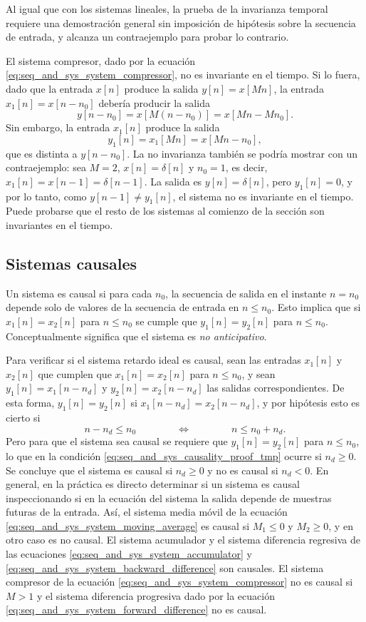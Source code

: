 \documentclass[a4paper]{report}
\begin{document}
Al igual que con los sistemas lineales, la prueba de la invarianza temporal requiere una demostración general sin imposición de hipótesis sobre la secuencia de entrada, y alcanza un contraejemplo para probar lo contrario.

El sistema compresor, dado por la ecuación \ref{eq:seq_and_sys_system_compressor}, no es invariante en el tiempo. Si lo fuera, dado que la entrada \(x[n]\) produce la salida \(y[n]=x[Mn]\), la entrada \(x_1[n]=x[n-n_0]\) debería producir la salida
\[
 y[n-n_0]=x[M(n-n_0)]=x[Mn-Mn_0].
\]
Sin embargo, la entrada \(x_1[n]\) produce la salida
\[
 y_1[n]=x_1[Mn]=x[Mn-n_0],
\]
que es distinta a \(y[n-n_0]\). La no invarianza también se podría mostrar con un contraejemplo: sea \(M=2\), \(x[n]=\delta[n]\) y \(n_0=1\), es decir, \(x_1[n]=x[n-1]=\delta[n-1]\). La salida es \(y[n]=\delta[n]\), pero \(y_1[n]=0\), y por lo tanto, como \(y[n-1]\neq y_1[n]\), el sistema no es invariante en el tiempo. Puede probarse que el resto de los sistemas al comienzo de la sección son invariantes en el tiempo.

\subsection{Sistemas causales}\label{sec:seq_and_sys_causal_system} 

Un sistema es causal si para cada \(n_0\), la secuencia de salida en el instante \(n=n_0\) depende solo de valores de la secuencia de entrada en \(n\leq n_0\). Esto implica que si \(x_1[n]=x_2[n]\) para \(n\leq n_0\) se cumple que \(y_1[n]=y_2[n]\) para \(n\leq n_0\). Conceptualmente significa que el sistema es \emph{no anticipativo}.

Para verificar si el sistema retardo ideal es causal, sean las entradas \(x_1[n]\) y \(x_2[n]\) que cumplen que \(x_1[n]=x_2[n]\) para \(n\leq n_0\), y sean \(y_1[n]=x_1[n-n_d]\) y \(y_2[n]=x_2[n-n_d]\) las salidas correspondientes. De esta forma, \(y_1[n]=y_2[n]\) si \(x_1[n-n_d]=x_2[n-n_d]\), y por hipótesis esto es cierto si 
\begin{equation}\label{eq:seq_and_sys_causality_proof_tmp}
 n-n_d\leq n_0
 \qquad\qquad\Leftrightarrow\qquad\qquad 
 n\leq n_0+n_d. 
\end{equation}
Pero para que el sistema sea causal se requiere que \(y_1[n]=y_2[n]\) para \(n\leq n_0\), lo que en la condición \ref{eq:seq_and_sys_causality_proof_tmp} ocurre si \(n_d\geq0\). Se concluye que el sistema es causal si \(n_d\geq0\) y no es causal si \(n_d<0\). En general, en la práctica es directo determinar si un sistema es causal inspeccionando si en la ecuación del sistema la salida depende de muestras futuras de la entrada. Así, el sistema media móvil de la ecuación \ref{eq:seq_and_sys_system_moving_average} es causal si \(M_1\leq0\) y \(M_2\geq0\), y en otro caso es no causal. El sistema acumulador y el sistema diferencia regresiva de las ecuaciones \ref{eq:seq_and_sys_system_accumulator} y \ref{eq:seq_and_sys_system_backward_difference} son causales. El sistema compresor de la ecuación \ref{eq:seq_and_sys_system_compressor} no es causal si \(M>1\) y el sistema diferencia progresiva dado por la ecuación \ref{eq:seq_and_sys_system_forward_difference} no es causal.
\end{document}
